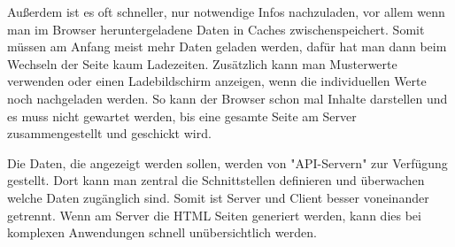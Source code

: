 Außerdem ist es oft schneller, nur notwendige Infos nachzuladen, vor allem wenn man im Browser heruntergeladene Daten in Caches zwischenspeichert. Somit müssen am Anfang meist mehr Daten geladen werden, dafür hat man dann beim Wechseln der Seite kaum Ladezeiten. Zusätzlich kann man Musterwerte verwenden oder einen Ladebildschirm anzeigen, wenn die individuellen Werte noch nachgeladen werden. So kann der Browser schon mal Inhalte darstellen und es muss nicht gewartet werden, bis eine gesamte Seite am Server zusammengestellt und geschickt wird.

Die Daten, die angezeigt werden sollen, werden von "API-Servern" zur Verfügung gestellt. Dort kann man zentral die Schnittstellen definieren und überwachen welche Daten zugänglich sind. Somit ist Server und Client besser voneinander getrennt. Wenn am Server die HTML Seiten generiert werden, kann dies bei komplexen Anwendungen schnell unübersichtlich werden.

